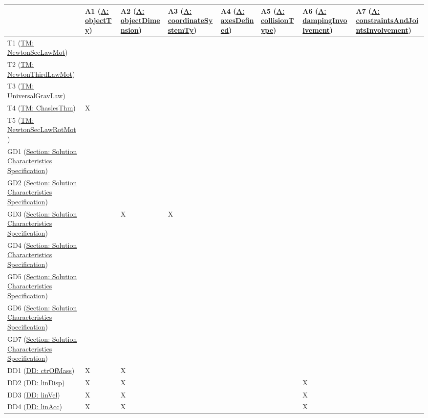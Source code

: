 \documentclass[12pt]{article}
\begin{document}
\begin{longtable}{l l l l l l l l}
\toprule
 & A1 (\hyperref[A:objectTy]{A: objectTy}) & A2 (\hyperref[A:objectDimension]{A: objectDimension}) & A3 (\hyperref[A:coordinateSystemTy]{A: coordinateSystemTy}) & A4 (\hyperref[A:axesDefined]{A: axesDefined}) & A5 (\hyperref[A:collisionType]{A: collisionType}) & A6 (\hyperref[A:dampingInvolvement]{A: dampingInvolvement}) & A7 (\hyperref[A:constraintsAndJointsInvolvement]{A: constraintsAndJointsInvolvement})
\\
\midrule
T1 (\hyperref[TM:NewtonSecLawMot]{TM: NewtonSecLawMot}) &  &  &  &  &  &  & 
\\
T2 (\hyperref[TM:NewtonThirdLawMot]{TM: NewtonThirdLawMot}) &  &  &  &  &  &  & 
\\
T3 (\hyperref[TM:UniversalGravLaw]{TM: UniversalGravLaw}) &  &  &  &  &  &  & 
\\
T4 (\hyperref[TM:ChaslesThm]{TM: ChaslesThm}) & X &  &  &  &  &  & 
\\
T5 (\hyperref[TM:NewtonSecLawRotMot]{TM: NewtonSecLawRotMot}) &  &  &  &  &  &  & 
\\
GD1 (\hyperref[Sec:SolCharSpec]{Section: Solution Characteristics Specification}) &  &  &  &  &  &  & 
\\
GD2 (\hyperref[Sec:SolCharSpec]{Section: Solution Characteristics Specification}) &  &  &  &  &  &  & 
\\
GD3 (\hyperref[Sec:SolCharSpec]{Section: Solution Characteristics Specification}) &  & X & X &  &  &  & 
\\
GD4 (\hyperref[Sec:SolCharSpec]{Section: Solution Characteristics Specification}) &  &  &  &  &  &  & 
\\
GD5 (\hyperref[Sec:SolCharSpec]{Section: Solution Characteristics Specification}) &  &  &  &  &  &  & 
\\
GD6 (\hyperref[Sec:SolCharSpec]{Section: Solution Characteristics Specification}) &  &  &  &  &  &  & 
\\
GD7 (\hyperref[Sec:SolCharSpec]{Section: Solution Characteristics Specification}) &  &  &  &  &  &  & 
\\
DD1 (\hyperref[DD:ctrOfMass]{DD: ctrOfMass}) & X & X &  &  &  &  & 
\\
DD2 (\hyperref[DD:linDisp]{DD: linDisp}) & X & X &  &  &  & X & 
\\
DD3 (\hyperref[DD:linVel]{DD: linVel}) & X & X &  &  &  & X & 
\\
DD4 (\hyperref[DD:linAcc]{DD: linAcc}) & X & X &  &  &  & X & 
\\

\end{longtable}
\end{document}
